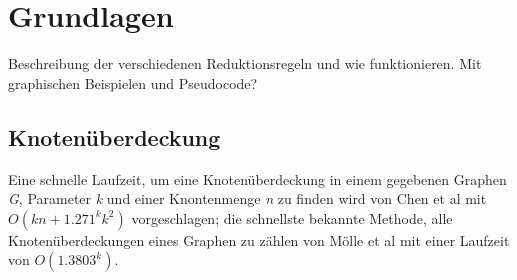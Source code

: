 
\chapter{Grundlagen}
\label{ch:Grundlagen}
Beschreibung der verschiedenen Reduktionsregeln und wie funktionieren. Mit graphischen Beispielen und Pseudocode?


\section{Knotenüberdeckung}
\label{ch:Grundlagen:sec:Knotenüberdeckung}

Eine schnelle Laufzeit, um eine Knotenüberdeckung in einem gegebenen Graphen \emph{G}, Parameter \emph{k} und einer Knontenmenge \emph{n} zu finden wird von Chen et al \cite{paper:4} mit $O(kn + 1.271^{k}k^{2})$ vorgeschlagen; die schnellste bekannte Methode, alle Knotenüberdeckungen eines Graphen zu zählen von Mölle et al \cite{paper:5} mit einer Laufzeit von $O(1.3803^{k})$.

